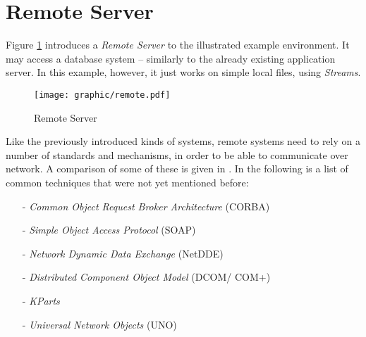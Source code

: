 %
%
%
%
%
%
%

\section{Remote Server}
\label{remote_server_heading}

Figure \ref{remote_figure} introduces a \emph{Remote Server} to the illustrated
example environment. It may access a database system -- similarly to the already
existing application server. In this example, however, it just works on simple
local files, using \emph{Streams}.

\begin{figure}[ht]
    \begin{center}
        \texttt{[image: graphic/remote.pdf]}
        \caption{Remote Server}
        \label{remote_figure}
    \end{center}
\end{figure}

Like the previously introduced kinds of systems, remote systems need to rely on
a number of standards and mechanisms, in order to be able to communicate over
network. A comparison of some of these is given in \cite{olson, brownech, hrastnik}.
In the following is a list of common techniques that were not yet mentioned
before:

\begin{itemize}
    \item[-] \emph{Common Object Request Broker Architecture} (CORBA)
        \cite{corba, vinoski, gruhn}
    \item[-] \emph{Simple Object Access Protocol} (SOAP) \cite{soap}
    \item[-] \emph{Network Dynamic Data Exchange} (NetDDE) \cite{ddefaq}
    \item[-] \emph{Distributed Component Object Model} (DCOM/ COM+) \cite{gruhn}
    \item[-] \emph{KParts} \cite{kde}
    \item[-] \emph{Universal Network Objects} (UNO) \cite{openoffice}
\end{itemize}
